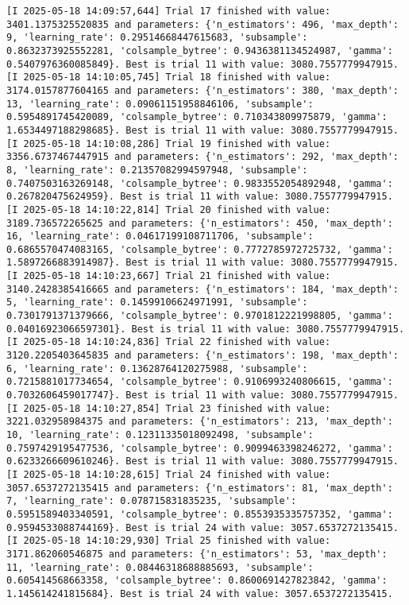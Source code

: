 \documentclass[
  letterpaper,
  DIV=11,
  numbers=noendperiod]{scrreprt}
\begin{document}
\begin{verbatim}
[I 2025-05-18 14:09:57,644] Trial 17 finished with value: 3401.1375325520835 and parameters: {'n_estimators': 496, 'max_depth': 9, 'learning_rate': 0.29514668447615683, 'subsample': 0.8632373925552281, 'colsample_bytree': 0.9436381134524987, 'gamma': 0.5407976360085849}. Best is trial 11 with value: 3080.7557779947915.
[I 2025-05-18 14:10:05,745] Trial 18 finished with value: 3174.0157877604165 and parameters: {'n_estimators': 380, 'max_depth': 13, 'learning_rate': 0.09061151958846106, 'subsample': 0.5954891745420089, 'colsample_bytree': 0.710343809975879, 'gamma': 1.6534497188298685}. Best is trial 11 with value: 3080.7557779947915.
[I 2025-05-18 14:10:08,286] Trial 19 finished with value: 3356.6737467447915 and parameters: {'n_estimators': 292, 'max_depth': 8, 'learning_rate': 0.21357082994597948, 'subsample': 0.7407503163269148, 'colsample_bytree': 0.9833552054892948, 'gamma': 0.267820475624959}. Best is trial 11 with value: 3080.7557779947915.
[I 2025-05-18 14:10:22,814] Trial 20 finished with value: 3189.736572265625 and parameters: {'n_estimators': 450, 'max_depth': 16, 'learning_rate': 0.04617199108711706, 'subsample': 0.6865570474083165, 'colsample_bytree': 0.7772785972725732, 'gamma': 1.5897266883914987}. Best is trial 11 with value: 3080.7557779947915.
[I 2025-05-18 14:10:23,667] Trial 21 finished with value: 3140.2428385416665 and parameters: {'n_estimators': 184, 'max_depth': 5, 'learning_rate': 0.14599106624971991, 'subsample': 0.7301791371379666, 'colsample_bytree': 0.9701812221998805, 'gamma': 0.04016923066597301}. Best is trial 11 with value: 3080.7557779947915.
[I 2025-05-18 14:10:24,836] Trial 22 finished with value: 3120.2205403645835 and parameters: {'n_estimators': 198, 'max_depth': 6, 'learning_rate': 0.13628764120275988, 'subsample': 0.7215881017734654, 'colsample_bytree': 0.9106993240806615, 'gamma': 0.7032606459017747}. Best is trial 11 with value: 3080.7557779947915.
[I 2025-05-18 14:10:27,854] Trial 23 finished with value: 3221.032958984375 and parameters: {'n_estimators': 213, 'max_depth': 10, 'learning_rate': 0.12311335018092498, 'subsample': 0.7597429195477536, 'colsample_bytree': 0.9099463398246272, 'gamma': 0.6233266609610246}. Best is trial 11 with value: 3080.7557779947915.
[I 2025-05-18 14:10:28,615] Trial 24 finished with value: 3057.6537272135415 and parameters: {'n_estimators': 81, 'max_depth': 7, 'learning_rate': 0.078715831835235, 'subsample': 0.5951589403340591, 'colsample_bytree': 0.8553935335757352, 'gamma': 0.9594533088744169}. Best is trial 24 with value: 3057.6537272135415.
[I 2025-05-18 14:10:29,930] Trial 25 finished with value: 3171.862060546875 and parameters: {'n_estimators': 53, 'max_depth': 11, 'learning_rate': 0.08446318688885693, 'subsample': 0.605414568663358, 'colsample_bytree': 0.8600691427823842, 'gamma': 1.145614241815684}. Best is trial 24 with value: 3057.6537272135415.

\end{verbatim}
\end{document}
